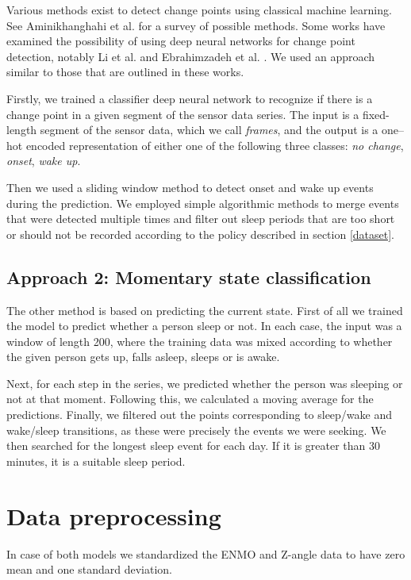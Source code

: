 \documentclass{article}
\begin{document}
Various methods exist to detect change points using classical machine learning. See Aminikhanghahi et al. \cite{aminikhanghahi17} for a survey of possible methods. Some works have examined the possibility of using deep neural networks for change point detection, notably Li et al. \cite{li2022automatic} and Ebrahimzadeh et al. \cite{multicpd}. We used an approach similar to those that are outlined in these works.

Firstly, we trained a classifier deep neural network to recognize if there is a change point in a given segment of the sensor data series. The input is a fixed-length segment of the sensor data, which we call \textit{frames}, and the output is a one–hot encoded representation of either one of the following three classes: \textit{no change}, \textit{onset}, \textit{wake up}.

Then we used a sliding window method to detect onset and wake up events during the prediction. We employed simple algorithmic methods to merge events that were detected multiple times and filter out sleep periods that are too short or should not be recorded according to the policy described in section \ref{dataset}.

\subsection{Approach 2: Momentary state classification}
The other method is based on predicting the current state. First of all we trained the model to predict whether a person sleep or not. In each case, the input was a window of length 200, where the training data was mixed according to whether the given person gets up, falls asleep, sleeps or is awake.

Next, for each step in the series, we predicted whether the person was sleeping or not at that moment. Following this, we calculated a moving average for the predictions. Finally, we filtered out the points corresponding to sleep/wake and wake/sleep transitions, as these were precisely the events we were seeking. We then searched for the longest sleep event for each day. If it is greater than 30 minutes, it is a suitable sleep period.

\section{Data preprocessing}
In case of both models we standardized the ENMO and Z-angle data to have zero mean and one standard deviation.
\end{document}
